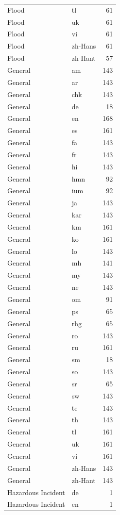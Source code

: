 \begin{longtable}{p{3cm} p{3cm} r}
Flood & tl & 61 \\
Flood & uk & 61 \\
Flood & vi & 61 \\
Flood & zh-Hans & 61 \\
Flood & zh-Hant & 57 \\
General & am & 143 \\
General & ar & 143 \\
General & chk & 143 \\
General & de & 18 \\
General & en & 168 \\
General & es & 161 \\
General & fa & 143 \\
General & fr & 143 \\
General & hi & 143 \\
General & hmn & 92 \\
General & ium & 92 \\
General & ja & 143 \\
General & kar & 143 \\
General & km & 161 \\
General & ko & 161 \\
General & lo & 143 \\
General & mh & 141 \\
General & my & 143 \\
General & ne & 143 \\
General & om & 91 \\
General & ps & 65 \\
General & rhg & 65 \\
General & ro & 143 \\
General & ru & 161 \\
General & sm & 18 \\
General & so & 143 \\
General & sr & 65 \\
General & sw & 143 \\
General & te & 143 \\
General & th & 143 \\
General & tl & 161 \\
General & uk & 161 \\
General & vi & 161 \\
General & zh-Hans & 143 \\
General & zh-Hant & 143 \\
Hazardous Incident & de & 1 \\
Hazardous Incident & en & 1 \\

\end{longtable}
